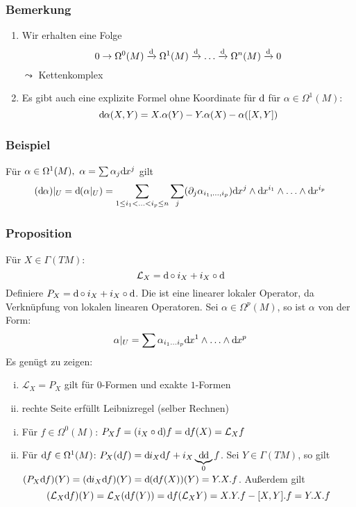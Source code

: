 \subsubsection{Bemerkung}
\label{ssub:193}
\begin{enumerate}
\item Wir erhalten eine Folge
\[
0 \to \Omega^0 (M) \xrightarrow{\mathrm{d}\mkern-1.0mu} \Omega^1 (M) \xrightarrow{\mathrm{d}\mkern-1.0mu} \ldots \xrightarrow{\mathrm{d}\mkern-1.0mu} \Omega^n (M) \xrightarrow{\mathrm{d}\mkern-1.0mu} 0
\]
$\leadsto$ Kettenkomplex
\item Es gibt auch eine explizite Formel ohne Koordinate für $\mathrm{d}\mkern-1.0mu$ für $\alpha \in \Omega^1 (M):$
\[
\mathrm{d}\mkern-1.0mu \alpha(X,Y) = X.\alpha(Y) - Y.\alpha(X) - \alpha([X,Y])
\]
\end{enumerate}

\subsubsection{Beispiel}
\label{ssub:194}
Für $\alpha \in \Omega^1 (M),\ \alpha = \sum \alpha_j \mathrm{d}\mkern-1.0mu x^j$ gilt
\[
(\mathrm{d}\mkern-1.0mu \alpha)\vert_U = \mathrm{d}\mkern-1.0mu(\alpha\vert_U) = \sum_{1\leq i_1 < \ldots <i_p \leq n } \sum_{j} (\partial_j \alpha_{i_1,\ldots, i_p}) \mathrm{d}\mkern-1.0mu x^j \wedge \mathrm{d}\mkern-1.0mu x^{i_1} \wedge \ldots \wedge \mathrm{d}\mkern-1.0mu x^{i_p}
\]

\subsubsection[Proposition: Cartansche Formel]{Proposition}
\label{ssub:195}
Für $X\in \Gamma(TM)$:
\[
\mathcal{L}_X = \mathrm{d}\mkern-1.0mu \circ i_X + i_X \circ \mathrm{d}\mkern-1.0mu
\]
Definiere $P_X = \mathrm{d}\mkern-1.0mu \circ i_X + i_X \circ \mathrm{d}\mkern-1.0mu$. Die ist eine linearer lokaler Operator, da Verknüpfung von lokalen linearen Operatoren. Sei $\alpha \in \Omega^p (M)$, so ist $\alpha$ von der Form:
\[
\alpha\vert_U = \sum \alpha_{i_1 \ldots i_p} \mathrm{d}\mkern-1.0mu x^1 \wedge \ldots \wedge \mathrm{d}\mkern-1.0mu x^p
\]
Es genügt zu zeigen:
\begin{enumerate}[(i)]
\item $\mathcal{L}_X = P_X$ gilt für $0$-Formen und exakte $1$-Formen 
\item rechte Seite erfüllt Leibnizregel (selber Rechnen)
\end{enumerate}
\begin{enumerate}[(i)]
\item Für $f\in \Omega^0 (M)$: $P_X f = (i_X \circ \mathrm{d}\mkern-1.0mu)f = \mathrm{d}\mkern-1.0mu f (X) = \mathcal{L}_X f$
\item Für $\mathrm{d}\mkern-1.0mu f \in \Omega^1 (M)$: $P_X(\mathrm{d}\mkern-1.0mu f) = \mathrm{d}\mkern-1.0mu i_X \mathrm{d}\mkern-1.0mu f + i_X \underbrace{\mathrm{d}\mkern-1.0mu \mathrm{d}\mkern-1.0mu}_{0} f$.
Sei $Y\in \Gamma(TM)$, so gilt $(P_X \mathd f)(Y) = (\mathd i_X \mathd f)(Y) = \mathd \enbrace*{\mathd f(X)}(Y) = Y.X.f$. Außerdem gilt
\[
\enbrace*{\mathcal{L}_X \mathd f}(Y) = \mathcal{L}_X \enbrace*{\mathd f (Y)} = \mathd f \enbrace*{\mathcal{L}_X Y} = X.Y.f - \benbrace{X,Y}.f = Y.X.f
\]
\end{enumerate}


